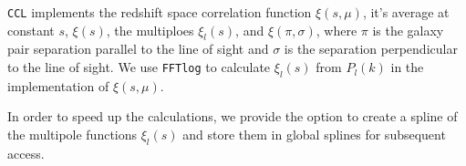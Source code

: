 \documentclass[\docopts]{\docclass}
\newcommand{\ccl}{{\tt CCL}\xspace}
\begin{document}
\ccl implements the redshift space correlation function $\xi(s, \mu)$, it's average at constant $s$, $\xi(s)$,
the multiploes $\xi_l(s)$, and $\xi(\pi, \sigma)$, where $\pi$ is the galaxy pair separation
parallel to the line of sight and $\sigma$ is the separation perpendicular to the line of sight.
We use {\tt FFTlog} to calculate $\xi_l(s)$ from $P_l(k)$ in the implementation of $\xi(s,\mu)$.

In order to speed up the calculations, we provide the option to create a spline
of the multipole functions $\xi_l(s)$ and store them in global splines for
subsequent access.

%
%
\end{document}
